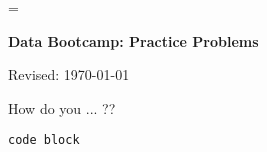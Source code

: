 \documentclass[11pt]{exam}
\begin{document}
\parskip=\bigskipamount
\parindent=0.0in
\thispagestyle{empty}


\bigskip\bigskip
\centerline{\Large \bf Data Bootcamp:  Practice Problems}
\centerline{Revised: \today}


\begin{questions}

\question How do you ... ??
\begin{verbatim}
code block
\end{verbatim} 


\question


\question


\end{questions}
\end{document}
